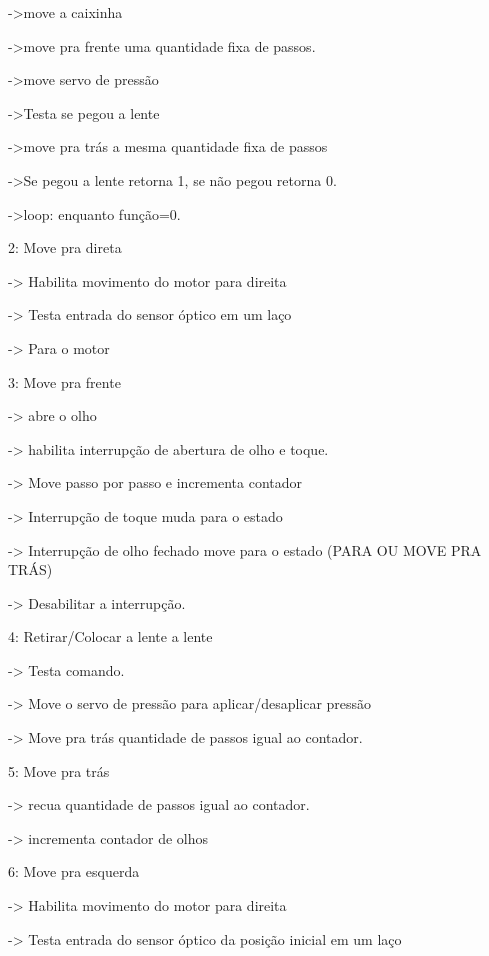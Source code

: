 \begin{apendicesenv}
                ->move a caixinha

                ->move pra frente uma quantidade fixa de passos.

                ->move servo de pressão

                ->Testa se pegou a lente

                ->move pra trás a mesma quantidade fixa de passos

                ->Se pegou a lente retorna 1, se não pegou retorna 0.

              ->loop: enquanto função=0. 
              
    2: Move pra direta

              -> Habilita movimento do motor para direita

              -> Testa entrada do sensor óptico em um laço

              -> Para o motor
              
    3: Move pra frente

              -> abre o olho

              -> habilita interrupção de abertura de olho e toque.

              -> Move passo por passo e incrementa contador

              -> Interrupção de toque muda para o estado

              -> Interrupção de olho fechado move para o estado (PARA OU MOVE PRA TRÁS)

              -> Desabilitar a interrupção.
   
    4: Retirar/Colocar a lente a lente

              -> Testa comando.

              -> Move o servo de pressão para aplicar/desaplicar pressão

              -> Move pra trás quantidade de passos igual ao contador. 
     
    
    5: Move pra trás       

              -> recua quantidade de passos igual ao contador.

              -> incrementa contador de olhos
            
              
     
    6: Move pra esquerda

             -> Habilita movimento do motor para direita

             -> Testa entrada do sensor óptico da posição inicial em um laço


\end{apendicesenv}
